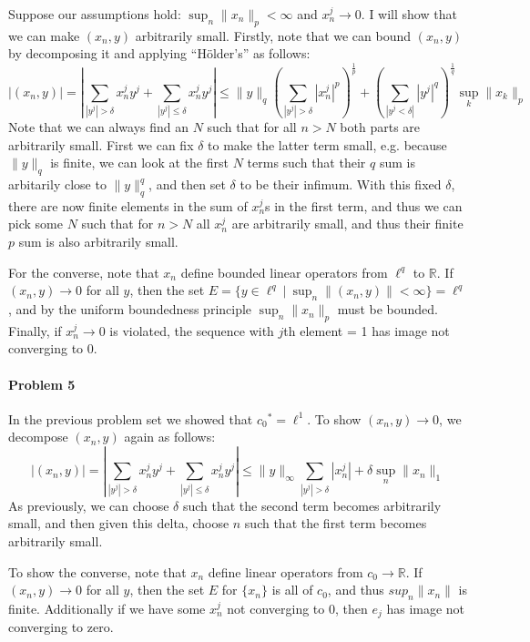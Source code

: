 \documentclass[12pt]{article}
\begin{document}
Suppose our assumptions hold: $\sup_n\|x_n\|_p<\infty$ and $x_n^j\to 0$. I will
show that we can make $(x_n,y)$ arbitrarily small. Firstly, note that we can
bound $(x_n,y)$ by decomposing it and applying ``H\"older's'' as follows:
\begin{displaymath}
  |(x_n,y)| =
  |\sum_{|y^j|>\delta}x_n^jy^j + \sum_{|y^j|\leq \delta}x_n^jy^j|
  \leq \|y\|_q\left(\sum_{|y^j|>\delta}|x_n^j|^p\right)^{\frac{1}{p}} +
  \left(\sum_{|y^j<\delta|}|y^j|^q\right)^{\frac{1}{q}}\sup_k\|x_k\|_p
\end{displaymath}
Note that we can always find an $N$ such that for all $n > N$ both parts are
arbitrarily small. First we can fix $\delta$ to make the latter term small,
e.g. because $\|y\|_q$ is finite, we can look at the first $N$ terms such that
their $q$ sum is arbitarily close to $\|y\|^q_q$, and then set $\delta$ to be
their infimum. With this fixed $\delta$, there are now finite elements in
the sum of $x^j_n$s in the first term, and thus we can pick some $N$ such that
for $n>N$ all $x^j_n$ are arbitrarily small, and thus their finite $p$ sum is
also arbitrarily small.

For the converse, note that $x_n$ define bounded linear operators from $\ell^q$ to
$\mathbb{R}$. If $(x_n,y)\to 0$ for all $y$, then the set $E = \{y\in\ell^q\ |
\ \sup_n\|(x_n,y)\| < \infty\} = \ell^q$, and by the uniform boundedness principle
$\sup_n\|x_n\|_{p}$ must be bounded. Finally,
if $x_n^j \to 0$ is violated, the sequence with $j$th element = 1 has image not 
converging to 0.

\paragraph{Problem 5}

In the previous problem set we showed that ${c_0}^* = \ell^1$. 
To show $(x_n,y)\to 0$, we decompose $(x_n,y)$ again as follows:
\begin{displaymath}
  |(x_n,y)| =
  |\sum_{|y^j|>\delta}x_n^jy^j + \sum_{|y^j|\leq \delta}x_n^jy^j|
  \leq \|y\|_\infty\sum_{|y^j|>\delta}|x_n^j| + \delta \sup_n\|x_n\|_1
\end{displaymath}
As previously, we can choose $\delta$ such that the second term becomes
arbitrarily small, and then given this delta, choose $n$ such that the first
term becomes arbitrarily small.

To show the converse, note that $x_n$ define linear operators from $c_0 \to
\mathbb{R}$. If $(x_n,y)\to 0$ for all $y$, then the set $E$ for $\{x_n\}$ is
all of $c_0$, and thus $sup_n\|x_n\|$ is finite. Additionally if we have some
$x_n^j$ not converging to $0$, then $e_j$ has image not converging to zero.
\end{document}
